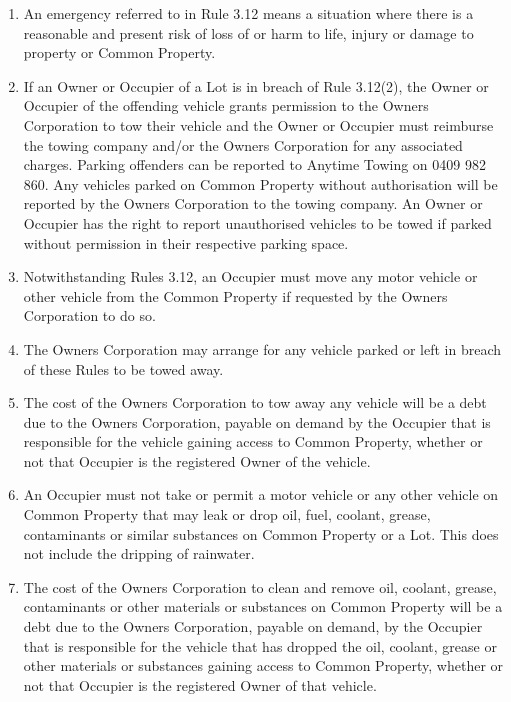 \documentclass{article}
\begin{document}
\begin{enumerate}[label=\arabic*.]
\begin{enumerate}[label=\arabic{enumi}.\arabic*.]
\begin{enumerate}[label=(\arabic*)]
\begin{enumerate}[label=(\alph*)]
\end{enumerate}

\item  An emergency referred to in Rule 3.12 means a situation where there is a reasonable and present risk of loss of or harm to life, injury or damage to property or Common Property.

\item  If an Owner or Occupier of a Lot is in breach of Rule 3.12(2), the Owner or Occupier of the offending vehicle grants permission to the Owners Corporation to tow their vehicle and the Owner or Occupier must reimburse the towing company and/or the Owners Corporation for any associated charges. Parking offenders can be reported to Anytime Towing on 0409 982 860. Any vehicles parked on Common Property without authorisation will be reported by the Owners Corporation to the towing company. An Owner or Occupier has the right to report unauthorised vehicles to be towed if parked without permission in their respective parking space.

\item  Notwithstanding Rules 3.12, an Occupier must move any motor vehicle or other vehicle from the Common Property if requested by the Owners Corporation to do so.

\item  The Owners Corporation may arrange for any vehicle parked or left in breach of these Rules to be towed away.
\newpage



\item  The cost of the Owners Corporation to tow away any vehicle will be a debt due to the Owners Corporation, payable on demand by the Occupier that is responsible for the vehicle gaining access to Common Property, whether or not that Occupier is the registered Owner of the vehicle.

\item  An Occupier must not take or permit a motor vehicle or any other vehicle on Common Property that may leak or drop oil, fuel, coolant, grease, contaminants or similar substances on Common Property or a Lot. This does not include the dripping of rainwater.

\item  The cost of the Owners Corporation to clean and remove oil, coolant, grease, contaminants or other materials or substances on Common Property will be a debt due to the Owners Corporation, payable on demand, by the Occupier that is responsible for the vehicle that has dropped the oil, coolant, grease or other materials or substances gaining access to Common Property, whether or not that Occupier is the registered Owner of that vehicle.


\end{enumerate}
\end{enumerate}
\end{enumerate}
\end{document}
